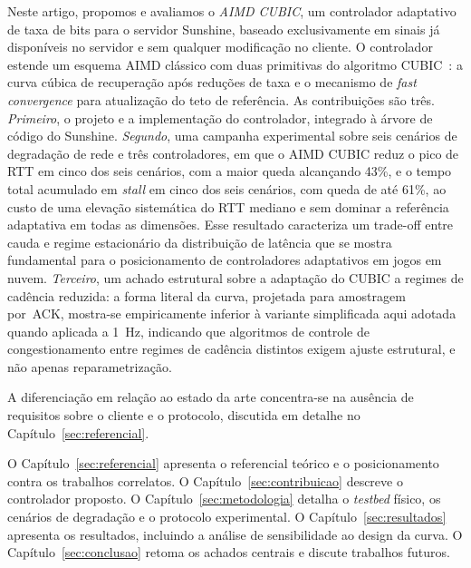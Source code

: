 Neste artigo, propomos e avaliamos o \emph{AIMD CUBIC}, um
controlador adaptativo de taxa de bits para o servidor
Sunshine, baseado exclusivamente em sinais já disponíveis no
servidor e sem qualquer modificação no cliente. O controlador
estende um esquema AIMD clássico com duas primitivas do
algoritmo CUBIC~\cite{cubic}: a curva cúbica de recuperação
após reduções de taxa e o mecanismo de \emph{fast convergence}
para atualização do teto de referência. As contribuições são
três. \emph{Primeiro}, o projeto e a implementação do
controlador, integrado à árvore de código do Sunshine.
\emph{Segundo}, uma campanha experimental sobre seis cenários
de degradação de rede e três controladores, em que o AIMD
CUBIC reduz o pico de RTT em cinco dos seis cenários, com a
maior queda alcançando 43\%, e o tempo total acumulado em
\emph{stall} em cinco dos seis cenários, com queda de até
61\%, ao custo de uma elevação sistemática do RTT mediano e
sem dominar a referência adaptativa em todas as dimensões.
Esse resultado caracteriza um trade-off entre cauda e regime
estacionário da distribuição de latência que se mostra
fundamental para o posicionamento de controladores
adaptativos em jogos em nuvem. \emph{Terceiro}, um achado
estrutural sobre a adaptação do CUBIC a regimes de cadência
reduzida: a forma literal da curva, projetada para amostragem
por~ACK, mostra-se empiricamente inferior à variante
simplificada aqui adotada quando aplicada a 1~Hz, indicando
que algoritmos de controle de congestionamento entre regimes
de cadência distintos exigem ajuste estrutural, e não apenas
reparametrização.

A diferenciação em relação ao estado da arte concentra-se na
ausência de requisitos sobre o cliente e o protocolo,
discutida em detalhe no Capítulo~\ref{sec:referencial}.

O Capítulo~\ref{sec:referencial} apresenta o referencial
teórico e o posicionamento contra os trabalhos correlatos. O
Capítulo~\ref{sec:contribuicao} descreve o controlador
proposto. O Capítulo~\ref{sec:metodologia} detalha o
\emph{testbed} físico, os cenários de degradação e o
protocolo experimental. O Capítulo~\ref{sec:resultados}
apresenta os resultados, incluindo a análise de sensibilidade
ao design da curva. O Capítulo~\ref{sec:conclusao} retoma os
achados centrais e discute trabalhos futuros.

